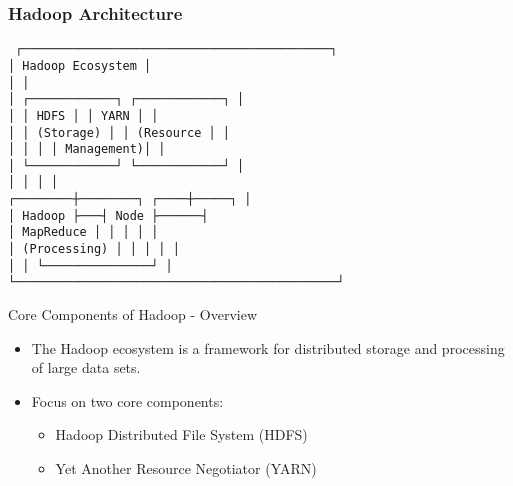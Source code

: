 \documentclass[aspectratio=169]{beamer}
\begin{document}
\begin{frame}[fragile]
    \frametitle{Hadoop Architecture}
    \begin{center}
        \texttt{
        ┌───────────────────────────────────────────┐ \\
        │             Hadoop Ecosystem              │ \\
        │                                           │ \\
        │ ┌────────────┐         ┌────────────┐    │ \\
        │ │    HDFS    │         │   YARN     │    │ \\
        │ │ (Storage)  │         │ (Resource  │    │ \\
        │ │            │         │ Management)│    │ \\
        │ └────────────┘         └────────────┘    │ \\
        │         │                  │               │ \\
        ┌────────┼────────┐     ┌────┼─────┐         │ \\
        │      Hadoop         ├───┤   Node    ├──────┤ \\
        │    MapReduce    │   │   │             │   │ \\
        │ (Processing)     │   │   │             │   │ \\
        │                  │    └───────────────┘    │ \\
        └─────────────────────────────────────────────┘
        }
    \end{center}
\end{frame}

\begin{frame}[fragile]{Core Components of Hadoop - Overview}
    \begin{itemize}
        \item The Hadoop ecosystem is a framework for distributed storage and processing of large data sets.
        \item Focus on two core components: 
        \begin{itemize}
            \item Hadoop Distributed File System (HDFS)
            \item Yet Another Resource Negotiator (YARN)
        \end{itemize}
    \end{itemize}
\end{frame}
\end{document}
